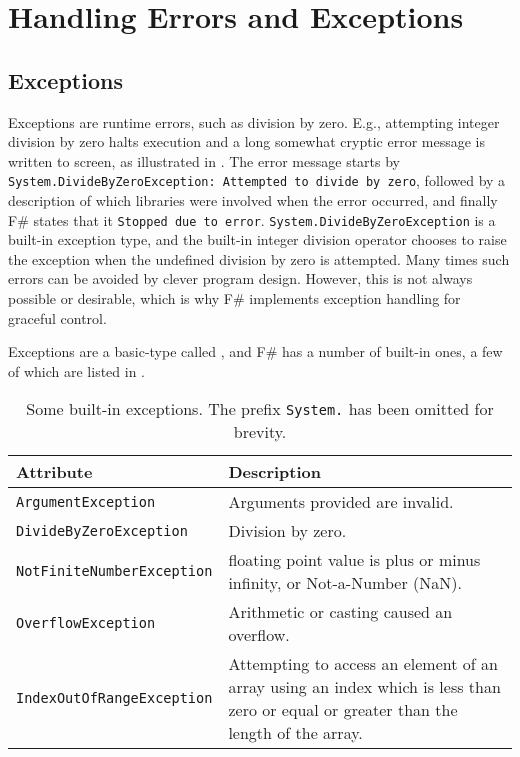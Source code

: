 \documentclass[fsharpnotes.tex]{subfiles}
\begin{document}
\chapter{Handling Errors and Exceptions}
\label{chap:errors}

\section{Exceptions}
\label{sec:exceptions}
Exceptions are runtime errors, such as division by zero. E.g., attempting integer division by zero halts execution and a long somewhat cryptic error message is written to screen, as illustrated in .
%
%
The error message starts by \lstinline[language=console]{System.DivideByZeroException: Attempted to divide by zero}, followed by a description of which libraries were involved when the error occurred, and finally F\# states that it \lstinline[language=console]{Stopped due to error}. \lstinline{System.DivideByZeroException} is a built-in exception type, and the built-in integer division operator chooses to raise the exception when the undefined division by zero is attempted. Many times such errors can be avoided by clever program design. However, this is not always possible or desirable, which is why F\# implements exception handling for graceful control.

Exceptions are a basic-type called , and F\# has a number of built-in ones, a few of which are listed in .
\begin{table}
  \centering
  \begin{tabularx}{\linewidth}{|l|X|}
    \hline
    \rowcolor{headerRowColor} Attribute & Description\\
    \hline
    \lstinline!ArgumentException! & Arguments provided are invalid.\\
    \hline
    \lstinline!DivideByZeroException! & Division by zero.\\
    \hline
    \lstinline!NotFiniteNumberException! & floating point value is plus or minus infinity, or Not-a-Number (NaN).\\
    \hline
    \lstinline!OverflowException! & Arithmetic or casting caused an overflow.\\
    \hline
    \lstinline!IndexOutOfRangeException! & Attempting to access an element of an array using an index which is less than zero or equal or greater than the length of the array.\\
    \hline
  \end{tabularx}
  \caption{Some built-in exceptions. The prefix \lstinline{System.} has been omitted for brevity.}
  \label{tab:exceptions}
\end{table}
\end{document}
